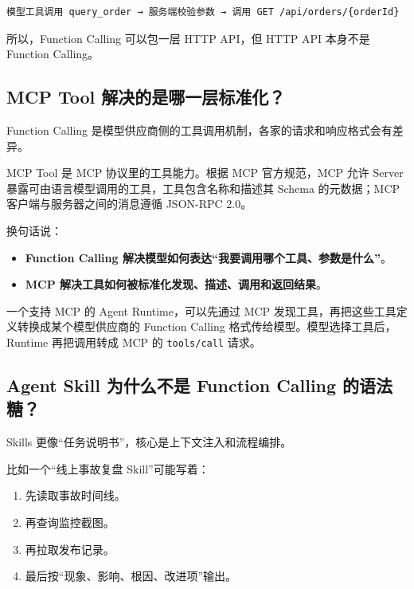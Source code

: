 \documentclass[10pt,a4paper]{ctexart}
\begin{document}
\begin{lstlisting}
模型工具调用 query_order → 服务端校验参数 → 调用 GET /api/orders/{orderId}
\end{lstlisting}



所以，Function Calling 可以包一层 HTTP API，但 HTTP API 本身不是 Function Calling。



\subsection{MCP Tool 解决的是哪一层标准化？}


Function Calling 是模型供应商侧的工具调用机制，各家的请求和响应格式会有差异。



MCP Tool 是 MCP 协议里的工具能力。根据 MCP 官方规范，MCP 允许 Server 暴露可由语言模型调用的工具，工具包含名称和描述其 Schema 的元数据；MCP 客户端与服务器之间的消息遵循 JSON-RPC 2.0。



换句话说：


\begin{itemize}[itemsep=2pt, topsep=4pt]
  \item \textbf{Function Calling 解决模型如何表达“我要调用哪个工具、参数是什么”}。
  \item \textbf{MCP 解决工具如何被标准化发现、描述、调用和返回结果}。
\end{itemize}


一个支持 MCP 的 Agent Runtime，可以先通过 MCP 发现工具，再把这些工具定义转换成某个模型供应商的 Function Calling 格式传给模型。模型选择工具后，Runtime 再把调用转成 MCP 的 \texttt{tools/call} 请求。



\subsection{Agent Skill 为什么不是 Function Calling 的语法糖？}


Skills 更像“任务说明书”，核心是上下文注入和流程编排。



比如一个“线上事故复盘 Skill”可能写着：


\begin{enumerate}[itemsep=2pt, topsep=4pt]
  \item 先读取事故时间线。
  \item 再查询监控截图。
  \item 再拉取发布记录。
  \item 最后按“现象、影响、根因、改进项”输出。
\end{enumerate}
\end{document}
